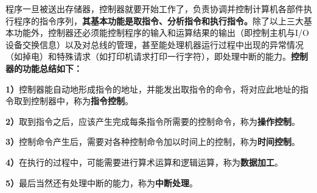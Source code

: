 {程序一旦被送出存储器，控制器就要开始工作了，负责协调并控制计算机各部件执行程序的指令序列，}\textbf{其基本功能是取指令、分析指令和执行指令。}{除了以上三大基本功能外，控制器还必须能控制程序的输入和运算结果的输出（即控制主机与I/O设备交换信息）以及对总线的管理，甚至能处理机器运行过程中出现的异常情况（如掉电）和特殊请求（如打印机请求打印一行字符），即处理中断的能力。}{\textbf{控制器的功能总结如下：}}

\textbf{1）}控制器能自动地形成指令的地址，并能发出取指令的命令，将对应此地址的指令取到控制器中，称为\textbf{指令控制}。

\textbf{2）}取到指令之后，应该产生完成每条指令所需要的控制命令，称为\textbf{操作控制}。

\textbf{3）}控制命令产生后，需要对各种控制命令加以时间上的控制，称为\textbf{时间控制}。

\textbf{4）}在执行的过程中，可能需要进行算术运算和逻辑运算，称为\textbf{数据加工}。

\textbf{5）}最后当然还有处理中断的能力，称为\textbf{中断处理}。
